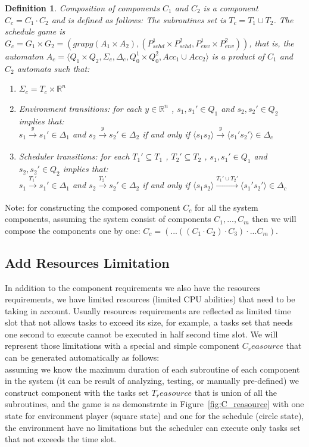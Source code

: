 \documentclass[ twoside, 12pt ]{article}
\newcommand\R{{\mathbb R}}
\newtheorem{dfn}{Definition} %
\begin{document}
\begin{dfn}
    Composition of components $C_1$ and $C_2$ is a component $C_c = C_1 \cdot C_2$ and is defined as follows:
    The subroutines set is $T_c=T_1 \cup T_2$.
    The schedule game is $G_c = G_1 \times G_2 = (grapg(A_1 \times A_2) ,(P_{schd}^1 \times P_{schd}^2, P_{env}^1 \times P_{env}^2))$, that is, the automaton $A_c= \langle Q_1 \times Q_2,\Sigma_c,\Delta_c,Q_0^1 \times Q_0^2,Acc_1 \cup Acc_2 \rangle$ is a product of $C_1$ and $C_2$ automata such that:
    \begin{enumerate}
        \item $\Sigma_c = T_c \times \R^n$
        \item Environment transitions: for each $y \in \R^n$ , $s_1 , s_1' \in Q_1$ and $s_2 , s_2' \in Q_2$ implies that:\\
        $s_{1} \xrightarrow[]{y} s_{1}' \in \Delta_1$ and $s_{2} \xrightarrow[]{y} s_{2}' \in \Delta_2$ 
        if and only if $\langle s_{1} s_2 \rangle \xrightarrow[]{y} \langle s_{1}' s_2' \rangle \in \Delta_c$
        \item Scheduler transitions: for each $T_1' \subseteq T_1$ , $T_2' \subseteq T_2$ , $s_1 , s_1' \in Q_1$ and $s_2 , s_2' \in Q_2$ implies that:\\ 
        $s_{1} \xrightarrow[]{T_1'} s_{1}' \in \Delta_1$ and $s_{2} \xrightarrow[]{T_2'} s_{2}' \in \Delta_2$ 
        if and only if $\langle s_{1} s_2 \rangle \xrightarrow[]{T_1' \cup T_2'} \langle s_{1}' s_2' \rangle \in \Delta_c$
    \end{enumerate}
\end{dfn}

Note: for constructing the composed component $C_c$ for all the system components, assuming the system consist of components $C_1 , ... , C_m$ then we will compose the components one by one: $C_c = (...((C_1 \cdot C_2) \cdot C_3 ) \cdot ... C_m)$.

\subsection{Add Resources Limitation}
In addition to the component requirements we also have the resources requirements, we have limited resources (limited CPU abilities) that need to be taking in account.
Usually resources requirements are reflected as limited time slot that not allows tasks to exceed its size, for example, a tasks set that needs one second to execute cannot be executed in half second time slot.
We will represent those limitations with a special and simple component $C_reasource$ that can be generated automatically as follows:\\
assuming we know the maximum duration of each subroutine of each component in the system (it can be result of analyzing, testing, or manually pre-defined) we construct component with the tasks set $T_reasource$ that is union of all the subroutines, and the game is as demonstrate in Figure~\ref{fig:C_reasource} with one state for environment player (square state) and one for the schedule (circle state), the environment have no limitations but the scheduler can execute only tasks set that not exceeds the time slot.
\end{document}
